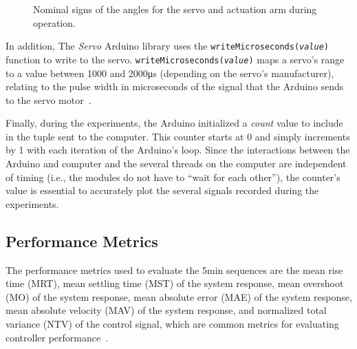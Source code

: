 \begin{figure}
    \centering
    \def\svgwidth{0.5\linewidth}
    \footnotesize\selectfont
    \caption{Nominal signs of the angles for the servo and actuation arm during operation.}
    \label{fig:schematic}
\end{figure}

In addition, The \emph{Servo} Arduino library uses the \texttt{writeMicroseconds(\emph{value})} function to write to the servo.
\texttt{writeMicroseconds(\emph{value})} maps a servo's range to a value between 1000 and 2000\si{\micro\second} (depending on the servo's manufacturer), relating to the pulse width in microseconds of the signal that the Arduino sends to the servo motor~\parencite{Arduino}.

Finally, during the experiments, the Arduino initialized a \emph{count} value to include in the tuple sent to the computer.
This counter starts at 0 and simply increments by 1 with each iteration of the Arduino's loop.
Since the interactions between the Arduino and computer and the several threads on the computer are independent of timing (i.e., the modules do not have to ``wait for each other''), the counter's value is essential to accurately plot the several signals recorded during the experiments.

\subsection{Performance Metrics}\label{subsec:metrics}
The performance metrics used to evaluate the 5\si{\minute} sequences are the mean rise time (MRT), mean settling time (MST) of the system response, mean overshoot (MO) of the system response, mean absolute error (MAE) of the system response, mean absolute velocity (MAV) of the system response, and normalized total variance (NTV) of the control signal, which are common metrics for evaluating controller performance~\parencite{Alfaro2016, Marshall1978}.

